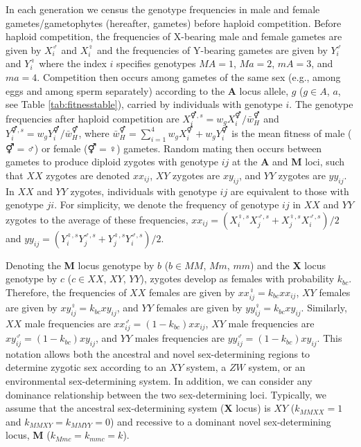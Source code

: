 \documentclass[12pt]{article}
\begin{document}
In each generation we census the genotype frequencies in male and female gametes/gametophytes (hereafter, gametes) before haploid competition. 
Before haploid competition, the frequencies of X-bearing male and female gametes are given by $X_{i}^{\male}$ and $X_{i}^{\female}$ and the frequencies of Y-bearing gametes are given by $Y_{i}^{\male}$ and $Y_{i}^{\female}$ where the index $i$ specifies genotypes $MA=1$, $Ma=2$, $mA=3$, and $ma=4$. 
Competition then occurs among gametes of the same sex (e.g., among eggs and among sperm separately) according to the \textbf{A} locus allele, $g$ ($g\in A$, $a$, see Table \ref{tab:fitnesstable}), carried by individuals with genotype $i$.
The genotype frequencies after haploid competition are $X_{i}^{\Hermaphrodite,s}= w_{g}X_{i}^{\Hermaphrodite}/\bar{w}_{H}^{\Hermaphrodite}$ and $Y_{i}^{\Hermaphrodite,s}= w_{g}Y_{i}^{\Hermaphrodite}/\bar{w}_{H}^{\Hermaphrodite}$, where $\bar{w}_{H}^{\Hermaphrodite}=\sum_{i=1}^{4} w_{g}X_{i}^{\Hermaphrodite}+w_{g}Y_{i}^{\Hermaphrodite}$ is the mean fitness of male ($\Hermaphrodite=\male$) or female ($\Hermaphrodite=\female$) gametes. 
Random mating then occurs between gametes to produce diploid zygotes with genotype $ij$ at the \textbf{A} and \textbf{M} loci, such that $XX$ zygotes are denoted $xx_{ij}$, $XY$ zygotes are $xy_{ij}$, and $YY$ zygotes are $yy_{ij}$. 
In $XX$ and $YY$ zygotes, individuals with genotype $ij$ are equivalent to those with genotype $ji$. 
For simplicity, we denote the frequency of genotype $ij$ in $XX$ and $YY$ zygotes to the average of these frequencies, $xx_{ij}=(X_{i}^{\female,s}X_{j}^{\male,s}+X_{j}^{\female,s}X_{i}^{\male,s})/2$ and $yy_{ij}=(Y_{i}^{\female,s}Y_{j}^{\male,s}+Y_{j}^{\female,s}Y_{i}^{\male,s})/2$. 

Denoting the \textbf{M} locus genotype by $b$ ($b\in MM$, $Mm$, $mm$) and the \textbf{X} locus genotype by $c$ ($c\in XX$, $XY$, $YY$), zygotes develop as females with probability $k_{bc}$. 
Therefore, the frequencies of $XX$ females are given by $xx_{ij}^{\female}=k_{bc}xx_{ij}$, $XY$ females are given by $xy_{ij}^{\female}=k_{bc}xy_{ij}$, and $YY$ females are given by $yy_{ij}^{\female}=k_{bc}xy_{ij}$. 
Similarly, $XX$ male frequencies are $xx_{ij}^{\male}=(1-k_{bc})xx_{ij}$, $XY$ male frequencies are $xy_{ij}^{\male}=(1-k_{bc})xy_{ij}$, and $YY$ males frequencies are $yy_{ij}^{\male}=(1-k_{bc})xy_{ij}$.
This notation allows both the ancestral and novel sex-determining regions to determine zygotic sex according to an $XY$ system, a $ZW$ system, or an environmental sex-determining system. 
In addition, we can consider any dominance relationship between the two sex-determining loci. 
Typically, we assume that the ancestral sex-determining system (\textbf{X} locus) is $XY$ ($k_{MMXX}=1$ and $k_{MMXY}=k_{MMYY}=0$) and recessive to a dominant novel sex-determining locus, \textbf{M} ($k_{Mmc}=k_{mmc}=k$). 
\end{document}
